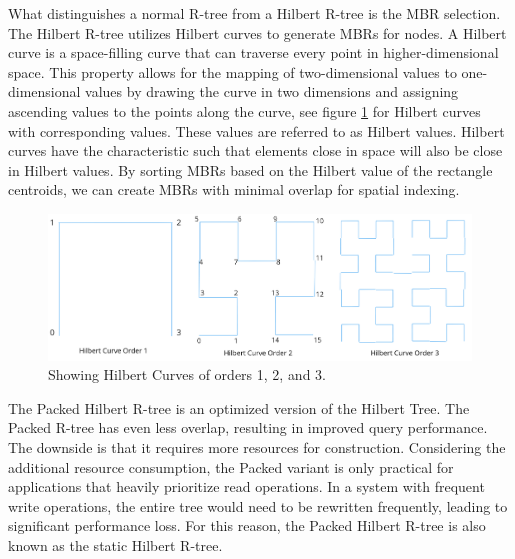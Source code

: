 What distinguishes a normal R-tree from a Hilbert R-tree is the MBR selection. The Hilbert R-tree utilizes Hilbert curves to generate MBRs for nodes. A Hilbert curve is a space-filling curve that can traverse every point in higher-dimensional space. This property allows for the mapping of two-dimensional values to one-dimensional values by drawing the curve in two dimensions and assigning ascending values to the points along the curve, see figure \ref{fig:hilbert} for Hilbert curves with corresponding values. These values are referred to as Hilbert values. Hilbert curves have the characteristic such that elements close in space will also be close in Hilbert values. By sorting MBRs based on the Hilbert value of the rectangle centroids, we can create MBRs with minimal overlap for spatial indexing.

\begin{figure}[t]
    \centering
    \includegraphics[width=\linewidth]{./figures/hilbert_orders.png}
    \caption{Showing Hilbert Curves of orders 1, 2, and 3.}
    \label{fig:hilbert}
\end{figure}

The Packed Hilbert R-tree is an optimized version of the Hilbert Tree. The Packed R-tree has even less overlap, resulting in improved query performance. The downside is that it requires more resources for construction. Considering the additional resource consumption, the Packed variant is only practical for applications that heavily prioritize read operations. In a system with frequent write operations, the entire tree would need to be rewritten frequently, leading to significant performance loss. For this reason, the Packed Hilbert R-tree is also known as the static Hilbert R-tree.
